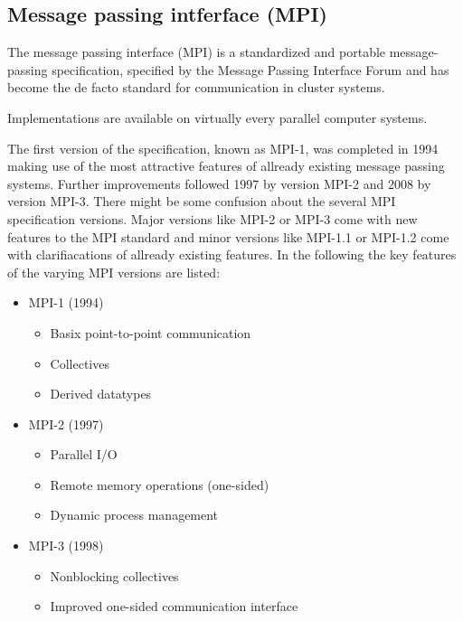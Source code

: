 \subsection{Message passing intferface (MPI)}
\label{sec:mpi}

The message passing interface (MPI) is a standardized and portable
message-passing specification, specified by the Message Passing
Interface Forum \cite{ref:mpi_specification} and has become
the de facto standard for communication in cluster systems. 

Implementations are available on virtually every parallel computer systems.

The first version of the specification, known as MPI-1, was completed
in 1994 making use of the most attractive features of allready
existing message passing systems.  Further improvements followed 1997
by version MPI-2 and 2008 by version MPI-3. There might be some
confusion about the several MPI specification versions. Major versions
like MPI-2 or MPI-3 come with new features to the MPI standard and
minor versions like MPI-1.1 or MPI-1.2 come with clarifiacations of
allready existing features.  In the following the key features of the
varying MPI versions are listed:

\begin{itemize}
  \item MPI-1 (1994)
    \begin{itemize}
      \item Basix point-to-point communication
      \item Collectives
      \item Derived datatypes
    \end{itemize}
  \item MPI-2 (1997)
    \begin{itemize}
      \item Parallel I/O
      \item Remote memory operations (one-sided)
      \item Dynamic process management
    \end{itemize}
  \item MPI-3 (1998)
    \begin{itemize}
      \item Nonblocking collectives
      \item Improved one-sided communication interface
    \end{itemize}
\end{itemize}

